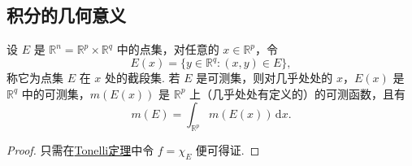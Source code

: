 \documentclass[../../main.tex]{subfiles}
\begin{document}
\subsection{积分的几何意义}

\begin{theorem}
设 \( E \) 是 \( \mathbb{R}^n = \mathbb{R}^p \times \mathbb{R}^q \) 中的点集，对任意的 \( x \in \mathbb{R}^p \)，令
\[
E(x) = \{ y \in \mathbb{R}^q : (x, y) \in E \},
\]
称它为点集 \( E \) 在 \( x \) 处的截段集. 若 \( E \) 是可测集，则对几乎处处的 \( x \)，\( E(x) \) 是 \( \mathbb{R}^q \) 中的可测集，\( m(E(x)) \) 是 \( \mathbb{R}^p \) 上（几乎处处有定义的）的可测函数，且有
\[
m(E) = \int_{\mathbb{R}^p} m(E(x)) \, \mathrm{d}x.
\]
\end{theorem}
\begin{proof}
只需在\hyperref[theorem:Tonelli 定理 非负可测函数的情形]{Tonelli定理}中令 \( f = \chi_E \) 便可得证.

\end{proof}
\end{document}

